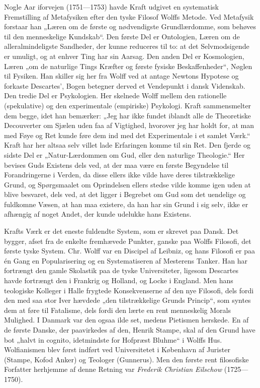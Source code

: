 \documentclass[12pt,a4paper,openany]{book}
\newcommand{\opage}[1]{\marginnote{\footnotesize\textit{[#1]}}}
\begin{document}
Nogle Aar iforvejen (1751---1753) havde Kraft udgivet en systematisk
Fremstilling af Metafysiken efter den tyske Filosof Wolffs Metode. Ved
Metafysik forstaar han „Læren om de første og nødvendigste Grundlærdomme, som
behøves til den menneskelige Kundskab“. Den første Del er Ontologien, Læren om
de alleralmindeligste Sandheder, der kunne reduceres til to: at det
Selvmodsigende er umuligt, og
\setcounter{footnote}{0}%
\opage{20}at enhver Ting har sin Aarsag. Den anden Del er Kosmologien, Læren
„om de naturlige Tings Kræfter og første fysiske Beskaffenheder“, Nøglen til
Fysiken. Han skiller sig her fra Wolff ved at antage Newtons Hypotese og
forkaste Descartes', Bogen betegner derved et Vendepunkt i dansk Videnskab. Den
tredie Del er Psykologien. Her skelnede Wolff mellem den rationelle
(spekulative) og den experimentale (empiriske) Psykologi. Kraft sammensmelter
dem begge, idet han bemærker: „Jeg har ikke fundet iblandt alle de Theoretiske
Decouverter om Sjælen uden faa af Vigtighed, hvorover jeg har holdt for, at man
med Føye og Ret kunde føre dem ind med det Experimentale i et samlet Værk.“
Kraft har her altsaa selv villet lade Erfaringen komme til sin Ret. Den fjerde
og sidste Del er „Natur-Lærdommen om Gud, eller den naturlige Theologie.“ Her
bevises Guds Existens dels ved, at der maa være en første Begyndelse til
Forandringerne i Verden, da disse ellers ikke vilde have deres tilstrækkelige
Grund, og Spørgsmaalet om Oprindelsen ellers stedse vilde komme igen uden at
blive besvaret, dels ved, at det ligger i Begrebet om Gud som det uendelige og
fuldkomne Væsen, at han maa existere, da han har sin Grund i sig selv, ikke er
afhængig af noget Andet, der kunde udelukke hans Existens.

Krafts Værk er det eneste fuldendte System, som er skrevet paa Dansk. Det
bygger, afset fra de enkelte fremhævede Punkter, ganske paa Wolffs Filosofi,
det første tyske System. Chr. Wolff var en Discipel af Leibniz, og hans
Filosofi er paa én Gang en Popularisering og en Systematiseren af Mesterens
Tanker. Han har fortrængt den gamle Skolastik paa de tyske Universiteter,
ligesom Descartes havde fortrængt den i Frankrig og Holland, og Locke i
England. Men hans teologiske Kolleger i Halle frygtede Konsekvenserne af den
nye Filosofi, dels fordi den med saa stor Iver hævdede „den tilstrækkelige
Grunds Princip“, som syntes dem at føre til Fatalisme, dels fordi den lærte en
rent menneskelig Morals Mulighed. I Danmark var den ogsaa ilde set, medens
Pietismen herskede. En af de første Danske, der paavirkedes af den, Henrik
Stampe, skal af den Grund have bot „halvt in%
\setcounter{footnote}{0}%
\opage{21}cognito, idetmindste for Hofpræst Bluhme“ i Wolffs Hus. Wolfianismen
blev først indført ved Universitetet i København af Jurister (Stampe, Kofod
Anker) og Teologer (Gunnerus). Men den første rent filosofiske Forfatter
herhjemme af denne Retning var \emph{Frederik} \emph{Christian} \emph{Eilschow}
(1725---1750).
\end{document}
